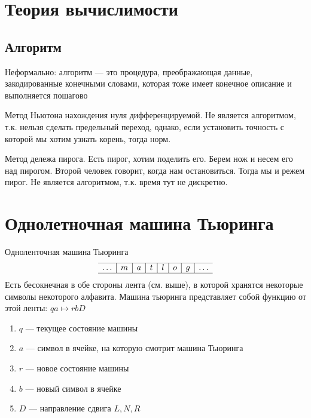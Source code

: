 
\section{Теория вычислимости}
\subsection{Алгоритм}
Неформально: алгоритм --- это процедура, преображающая данные, закодированные конечными словами, которая тоже имеет конечное описание и выполняется пошагово

\begin{example}[Не алгоритм]
    Метод Ньютона нахождения нуля дифференцируемой. Не является алгоритмом, т.к. нельзя сделать предельный переход, однако, если установить точность с которой мы хотим узнать корень, тогда норм.
\end{example}
\begin{example}[Не алгоритм]
    Метод дележа пирога. Есть пирог, хотим поделить его. Берем нож и несем его над пирогом. Второй человек говорит, когда нам остановиться. Тогда мы и режем пирог. Не является алгоритмом, т.к. время тут не дискретно.
\end{example}

\section{Однолетночная машина Тьюринга}
Одноленточная машина Тьюринга
\[\begin{array}{c|c|c|c|c|c|c|c}
    \hline
    \dots & m & a & t & l & o & g & \dots \\
    \hline
\end{array}\]
Есть бесокнечная в обе стороны лента (см. выше), в которой хранятся некоторые символы некоторого алфавита. Машина тьюринга представляет собой функцию от этой ленты:
\(qa \mapsto rbD\)
\begin{enumerate}
    \item \(q\) --- текущее состояние машины
    \item \(a\) --- символ в ячейке, на которую смотрит машина Тьюринга
    \item \(r\) --- новое состояние машины
    \item \(b\) --- новый символ в ячейке
    \item \(D\) --- направление сдвига \(L, N, R\)
\end{enumerate}


